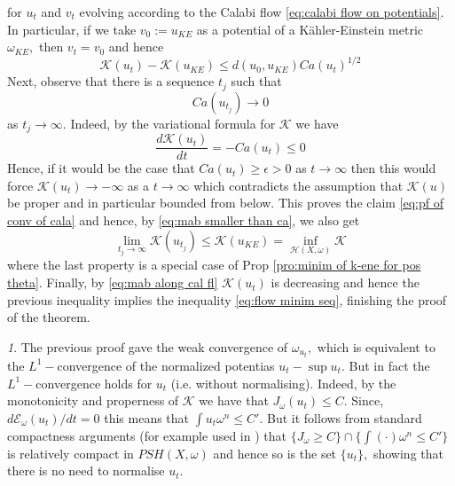\documentclass[11pt,oneside,english]{amsart}
\numberwithin{equation}{section}
\numberwithin{figure}{section}
\theoremstyle{plain}
\theoremstyle{plain}
\theoremstyle{plain}
\theoremstyle{plain}
\theoremstyle{remark}
\newtheorem{rem}[thm]{\protect\remarkname}
\theoremstyle{definition}
\providecommand{\remarkname}{Remark}
\begin{document}
 for $u_{t}$ and $v_{t}$ evolving according to the Calabi flow \ref{eq:calabi flow on potentials}.
In particular, if we take $v_{0}:=u_{KE}$ as a potential of a Kähler-Einstein
metric $\omega_{KE},$ then $v_{t}=v_{0}$ and hence 
\begin{equation}
\mathcal{K}(u_{t})-\mathcal{K}(u_{KE})\leq d(u_{0},u_{KE})Ca(u_{t})^{1/2}\label{eq:mab smaller than ca}
\end{equation}
 Next, observe that there is a sequence $t_{j}$ such that 
\begin{equation}
Ca(u_{t_{j}})\rightarrow0\label{eq:pf of conv of cala}
\end{equation}
 as $t_{j}\rightarrow\infty.$ Indeed, by the variational formula
for $\mathcal{K}$ we have 
\begin{equation}
\frac{d\mathcal{K}(u_{t})}{dt}=-Ca(u_{t})\leq0\label{eq:mab along cal fl}
\end{equation}
 Hence, if it would be the case that $Ca(u_{t})\geq\epsilon>0$ as
$t\rightarrow\infty$ then this would force $\mathcal{K}(u_{t})\rightarrow-\infty$
as a $t\rightarrow\infty$ which contradicts the assumption that $\mathcal{K}(u)$
be proper and in particular bounded from below. This proves the claim
\ref{eq:pf of conv of cala} and hence, by \ref{eq:mab smaller than ca},
we also get 
\begin{equation}
\lim_{t_{j}\rightarrow\infty}\mathcal{K}(u_{t_{j}})\leq\mathcal{K}(u_{KE})=\inf_{\mathcal{H}(X,\omega)}\mathcal{K}\label{eq:subseq for mab along flow}
\end{equation}
 where the last property is a special case of Prop \ref{pro:minim of k-ene for pos theta}.
Finally, by \ref{eq:mab along cal fl} $\mathcal{K}(u_{t})$ is decreasing
and hence the previous inequality implies the inequality \ref{eq:flow minim seq},
finishing the proof of the theorem.
\begin{rem}
The previous proof gave the weak convergence of $\omega_{u_{t}},$
which is equivalent  to the $L^{1}-$convergence of the normalized
potentias $u_{t}-\sup u_{t}.$ But in fact the $L^{1}-$convergence
holds for $u_{t}$ (i.e. without normalising). Indeed, by the monotonicity
and properness of $\mathcal{K}$ we have that $J_{\omega}(u_{t})\leq C.$
Since, $d\mathcal{E}_{\omega}(u_{t})/dt=0$ this means that $\int u_{t}\omega^{n}\leq C'.$
But it follows from standard compactness arguments (for example used
in \cite{bbgz}) that $\{J_{\omega}\geq C\}\cap\{\int(\cdot)\omega^{n}\leq C'\}$
is relatively compact in $PSH(X,\omega)$ and hence so is the set
$\{u_{t}\},$ showing that there is no need to normalise $u_{t}.$ 
\end{rem}
\end{document}
